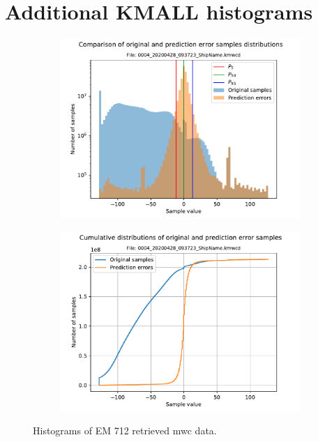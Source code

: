 \chapter{Additional KMALL histograms} \label{ch:kmall_hists}
\begin{figure}[h!]
	\centering
	\begin{subfigure}{0.45\textwidth}
		\centering
		\includegraphics[width=\linewidth]{images/kmall_hists/0004_20200428_093723_ShipName.kmwcd_hist.pdf}
	\end{subfigure}%
	\begin{subfigure}{0.45\textwidth}
		\centering
		\includegraphics[width=\linewidth]{images/kmall_hists/0004_20200428_093723_ShipName.kmwcd_hist_cum.pdf}
	\end{subfigure}
	\caption{Histograms of EM 712 retrieved \acrshort{mwc} data.}
	\label{fig:0004_kmall}
\end{figure}

